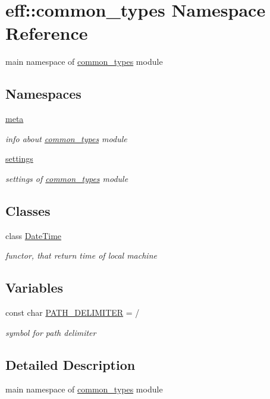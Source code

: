 \hypertarget{namespaceeff_1_1common__types}{}\section{eff\+:\+:common\+\_\+types Namespace Reference}
\label{namespaceeff_1_1common__types}


main namespace of \hyperlink{namespaceeff_1_1common__types}{common\+\_\+types} module  


\subsection*{Namespaces}
\begin{DoxyCompactItemize}
\item 
 \hyperlink{namespaceeff_1_1common__types_1_1meta}{meta}
\begin{DoxyCompactList}\small\item\em info about \hyperlink{namespaceeff_1_1common__types}{common\+\_\+types} module \end{DoxyCompactList}\item 
 \hyperlink{namespaceeff_1_1common__types_1_1settings}{settings}
\begin{DoxyCompactList}\small\item\em settings of \hyperlink{namespaceeff_1_1common__types}{common\+\_\+types} module \end{DoxyCompactList}\end{DoxyCompactItemize}
\subsection*{Classes}
\begin{DoxyCompactItemize}
\item 
class \hyperlink{classeff_1_1common__types_1_1DateTime}{Date\+Time}
\begin{DoxyCompactList}\small\item\em functor, that return time of local machine \end{DoxyCompactList}\end{DoxyCompactItemize}
\subsection*{Variables}
\begin{DoxyCompactItemize}
\item 
\mbox{\label{namespaceeff_1_1common__types_aefd5fbcf71bed59c5f3c5135d826a801}} 
const char \hyperlink{namespaceeff_1_1common__types_aefd5fbcf71bed59c5f3c5135d826a801}{P\+A\+T\+H\+\_\+\+D\+E\+L\+I\+M\+I\+T\+ER} = \textquotesingle{}/\textquotesingle{}
\begin{DoxyCompactList}\small\item\em symbol for path delimiter \end{DoxyCompactList}\end{DoxyCompactItemize}


\subsection{Detailed Description}
main namespace of \hyperlink{namespaceeff_1_1common__types}{common\+\_\+types} module 